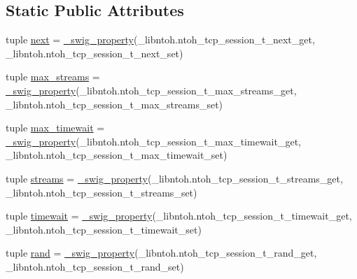 \subsection*{Static Public Attributes}
\begin{DoxyCompactItemize}
\item 
tuple \hyperlink{classlibntoh_1_1ntoh__tcp__session__t_a84e6dac37062f5a539ece8248c8567cc}{next} = \hyperlink{namespacelibntoh_ae6f5626f776538e0cdb00e75ca1c96c9}{\-\_\-swig\-\_\-property}(\-\_\-libntoh.\-ntoh\-\_\-tcp\-\_\-session\-\_\-t\-\_\-next\-\_\-get, \-\_\-libntoh.\-ntoh\-\_\-tcp\-\_\-session\-\_\-t\-\_\-next\-\_\-set)
\item 
tuple \hyperlink{classlibntoh_1_1ntoh__tcp__session__t_ab08551f389ac2ec08b906a250a850739}{max\-\_\-streams} = \hyperlink{namespacelibntoh_ae6f5626f776538e0cdb00e75ca1c96c9}{\-\_\-swig\-\_\-property}(\-\_\-libntoh.\-ntoh\-\_\-tcp\-\_\-session\-\_\-t\-\_\-max\-\_\-streams\-\_\-get, \-\_\-libntoh.\-ntoh\-\_\-tcp\-\_\-session\-\_\-t\-\_\-max\-\_\-streams\-\_\-set)
\item 
tuple \hyperlink{classlibntoh_1_1ntoh__tcp__session__t_ad01cf9ea23f35bfa4d5bab3c0f182e42}{max\-\_\-timewait} = \hyperlink{namespacelibntoh_ae6f5626f776538e0cdb00e75ca1c96c9}{\-\_\-swig\-\_\-property}(\-\_\-libntoh.\-ntoh\-\_\-tcp\-\_\-session\-\_\-t\-\_\-max\-\_\-timewait\-\_\-get, \-\_\-libntoh.\-ntoh\-\_\-tcp\-\_\-session\-\_\-t\-\_\-max\-\_\-timewait\-\_\-set)
\item 
tuple \hyperlink{classlibntoh_1_1ntoh__tcp__session__t_a89d606a1c25ff8a032d2716489f69fcc}{streams} = \hyperlink{namespacelibntoh_ae6f5626f776538e0cdb00e75ca1c96c9}{\-\_\-swig\-\_\-property}(\-\_\-libntoh.\-ntoh\-\_\-tcp\-\_\-session\-\_\-t\-\_\-streams\-\_\-get, \-\_\-libntoh.\-ntoh\-\_\-tcp\-\_\-session\-\_\-t\-\_\-streams\-\_\-set)
\item 
tuple \hyperlink{classlibntoh_1_1ntoh__tcp__session__t_a5dfb36debadedad1db9bdc1ad97ab821}{timewait} = \hyperlink{namespacelibntoh_ae6f5626f776538e0cdb00e75ca1c96c9}{\-\_\-swig\-\_\-property}(\-\_\-libntoh.\-ntoh\-\_\-tcp\-\_\-session\-\_\-t\-\_\-timewait\-\_\-get, \-\_\-libntoh.\-ntoh\-\_\-tcp\-\_\-session\-\_\-t\-\_\-timewait\-\_\-set)
\item 
tuple \hyperlink{classlibntoh_1_1ntoh__tcp__session__t_afdb09afb7e6838badc0bf2a63b8df8c5}{rand} = \hyperlink{namespacelibntoh_ae6f5626f776538e0cdb00e75ca1c96c9}{\-\_\-swig\-\_\-property}(\-\_\-libntoh.\-ntoh\-\_\-tcp\-\_\-session\-\_\-t\-\_\-rand\-\_\-get, \-\_\-libntoh.\-ntoh\-\_\-tcp\-\_\-session\-\_\-t\-\_\-rand\-\_\-set)

\end{DoxyCompactItemize}
